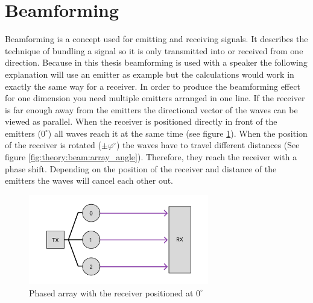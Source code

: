 \section{Beamforming}\label{sec:theory:beam}


Beamforming is a concept used for emitting and receiving signals. It describes the technique of bundling a signal so it is only transmitted into or received from one direction. Because in this thesis beamforming is used with a speaker the following explanation will use an emitter as example but the calculations would work in exactly the same way for a receiver.\cite{van_veen_beamforming_1988}\p
%
In order to produce the beamforming effect for one dimension you need multiple emitters arranged in one line.
If the receiver is far enough away from the emitters the directional vector of the waves can be viewed as parallel. When the receiver is positioned directly in front of the emitters (\(0^\circ\)) all waves reach it at the same time (see figure \ref{fig:theory:beam:array_straight}).
When the position of the receiver is rotated (\(\pm \varphi^\circ\)) the waves have to travel different distances (See figure \ref{fig:theory:beam:array_angle}). Therefore, they reach the receiver with a phase shift. Depending on the position of the receiver and distance of the emitters the waves will cancel each other out.
%
\begin{figure}
  \centering
  \includegraphics[width=0.7\textwidth]{src/assets/pictures/theory/straight_array.png}
  \caption{Phased array with the receiver positioned at $0^\circ$}\label{fig:theory:beam:array_straight}
\end{figure}
